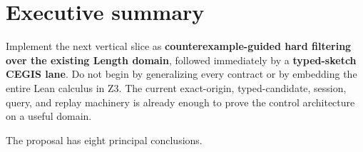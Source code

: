 \documentclass[11pt,oneside]{report}
\begin{document}
\chapter*{Executive summary}

\begin{recommendation}
Implement the next vertical slice as \textbf{counterexample-guided hard filtering over the existing Length domain}, followed immediately by a \textbf{typed-sketch CEGIS lane}. Do not begin by generalizing every contract or by embedding the entire Lean calculus in Z3. The current exact-origin, typed-candidate, session, query, and replay machinery is already enough to prove the control architecture on a useful domain.
\end{recommendation}

The proposal has eight principal conclusions.
\end{document}
